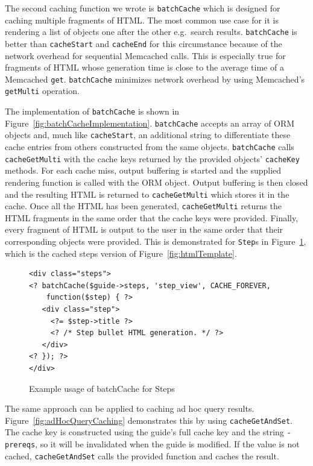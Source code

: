 \documentclass[12pt]{ucthesis}
\begin{document}
The second caching function we wrote is {\tt batchCache} which is designed for caching multiple fragments of HTML\@.
The most common use case for it is rendering a list of objects one after the other e.g.\ search results.
{\tt batchCache} is better than {\tt cacheStart} and {\tt cacheEnd} for this circumstance because of the network overhead for sequential \textsf{Memcached} calls.
This is especially true for fragments of HTML whose generation time is close to the average time of a \textsf{Memcached} {\tt get}.
{\tt batchCache} minimizes network overhead by using \textsf{Memcached}'s {\tt getMulti} operation.

The implementation of {\tt batchCache} is shown in Figure~\ref{fig:batchCacheImplementation}.
{\tt batchCache} accepts an array of ORM objects and, much like {\tt cacheStart}, an additional string to differentiate these cache entries from others constructed from the same objects.
{\tt batchCache} calls {\tt cacheGetMulti} with the cache keys returned by the provided objects' {\tt cacheKey} methods.
For each cache miss, output buffering is started and the supplied rendering function is called with the ORM object.
Output buffering is then closed and the resulting HTML is returned to {\tt cacheGetMulti} which stores it in the cache.
Once all the HTML has been generated, {\tt cacheGetMulti} returns the HTML fragments in the same order that the cache keys were provided.
Finally, every fragment of HTML is output to the user in the same order that their corresponding objects were provided.
This is demonstrated for {\tt Step}s in Figure~\ref{fig:batchCacheStep}, which is the cached steps version of Figure~\ref{fig:htmlTemplate}.

\begin{figure}[h]
\begin{ssp}
\begin{verbatim}
<div class="steps">
<? batchCache($guide->steps, 'step_view', CACHE_FOREVER,
    function($step) { ?>
   <div class="step">
     <?= $step->title ?>
     <? /* Step bullet HTML generation. */ ?>
   </div>
<? }); ?>
</div>
\end{verbatim}
\caption{Example usage of batchCache for Steps}
\label{fig:batchCacheStep}
\end{ssp}
\end{figure}

The same approach can be applied to caching ad hoc query results.
Figure~\ref{fig:adHocQueryCaching} demonstrates this by using {\tt cacheGetAndSet}.
The cache key is constructed using the guide's full cache key and the string {\tt -prereqs}, so it will be invalidated when the guide is modified.
If the value is not cached, {\tt cacheGetAndSet} calls the provided function and caches the result.
\end{document}

